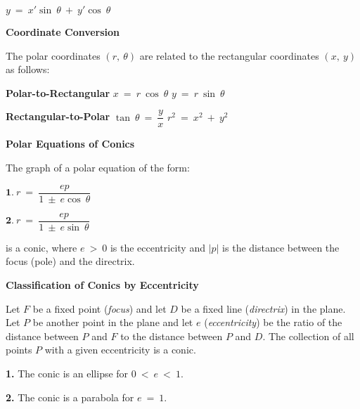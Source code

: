 \documentclass{article}
\begin{document}
\begin{large}
\hspace{1.75in} $y\ =\ x'\sin \ \theta\ +\ y'\cos \ \theta$

\vspace{0.1in}
\textbf{Coordinate Conversion}

\hspace{0.1in} The polar coordinates $(r,\ \theta)$ are related to the rectangular coordinates $(x,\ y)$ as follows:

\hspace{0.5in} \textbf{Polar-to-Rectangular} \hspace{0.1in} $x\ =\ r\ \cos \ \theta$ \hspace{0.2in} $y\ =\ r\ \sin \ \theta$

\hspace{0.5in} \textbf{Rectangular-to-Polar} \hspace{0.1in} $\tan \ \theta\ =\ \dfrac{y}{x}$ \hspace{0.2in} $r^{2}\ =\ x^{2}\ +\ y^{2}$

\textbf{Polar Equations of Conics}

\hspace{0.1in} The graph of a polar equation of the form:

\hspace{0.2in} $\textbf{1.}\ r\ =\ \dfrac{ep}{1\ \pm\ e\cos \ \theta}$ \hspace{0.1in} 

\hspace{0.2in} $\textbf{2.}\ r\ =\ \dfrac{ep}{1\ \pm\ e\sin \ \theta}$

\hspace{0.1in} is a conic, where $e\ >\ 0$ is the eccentricity and $|p|$ is the distance between the focus (pole) and the directrix.

\textbf{Classification of Conics by Eccentricity}

\hspace{0.1in} Let $F$ be a fixed point (\textit{focus}) and let $D$ be a fixed line (\textit{directrix}) in the plane.  Let $P$ be another point in the plane and let $e$ (\textit{eccentricity}) be the ratio of the distance between $P$ and $F$ to the distance between $P$ and $D$.  The collection of all points $P$ with a given eccentricity is a conic.

\hspace{0.2in} \textbf{1.} The conic is an ellipse for $0\ <\ e\ <\ 1$.

\hspace{0.2in} \textbf{2.} The conic is a parabola for $e\ =\ 1$.


\end{large}
\end{document}

